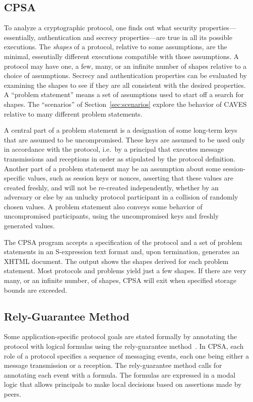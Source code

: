 \documentclass[titlepage,12pt]{article}
\theoremstyle{definition}
\begin{document}
\subsection{CPSA}\label{sec:cpsa}

To analyze a cryptographic protocol, one finds out what security
properties---essentially, authentication and secrecy properties---are
true in all its possible executions. The {\em shapes} of a protocol,
relative to some assumptions, are the minimal, essentially different
executions compatible with those assumptions. A protocol may have one,
a few, many, or an infinite number of shapes relative to a choice of
assumptions.  Secrecy and authentication properties can be evaluated
by examining the shapes to see if they are all consistent with the
desired properties.  A ``problem statement'' means a set of
assumptions used to start off a search for shapes.  The ``scenarios''
of Section~\ref{sec:scenarios} explore the behavior of CAVES relative
to many different problem statements.

A central part of a problem statement is a designation of some
long-term keys that are assumed to be uncompromised.  These keys are
assumed to be used only in accordance with the protocol, i.e.~by a
principal that executes message transmissions and receptions in order
as stipulated by the protocol definition.  Another part of a problem
statement may be an assumption about some session-specific values,
such as session keys or nonces, asserting that these values are
created freshly, and will not be re-created independently, whether by
an adversary or else by an unlucky protocol participant in a collision
of randomly chosen values.  A problem statement also conveys some
behavior of uncompromised participants, using the uncompromised keys
and freshly generated values.

The CPSA program accepts a specification of the protocol and a set of
problem statements in an S-expression text format and, upon
termination, generates an XHTML document.  The output shows the shapes
derived for each problem statement. Most protocols and problems yield
just a few shapes. If there are very many, or an infinite number, of
shapes, CPSA will exit when specified storage bounds are exceeded.

\subsection{Rely-Guarantee Method}

Some application-specific protocol goals are stated formally by
annotating the protocol with logical formulas using the rely-guarantee
method~\cite{GHTCRS05}.  In CPSA, each role of a protocol specifies a
sequence of messaging events, each one being either a message
transmission or a reception.  The rely-guarantee method calls for
annotating each event with a formula.  The formulas are expressed in a
modal logic that allows principals to make local decisions based on
assertions made by peers.
\end{document}
